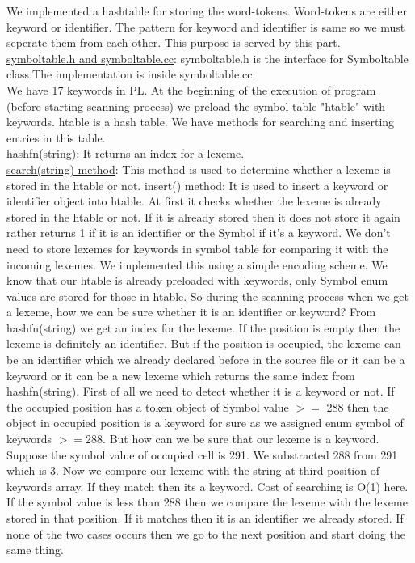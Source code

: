 \documentclass[paper=letter, fontsize=12pt]{scrartcl} %
\begin{document}
We implemented a hashtable for storing the word-tokens. Word-tokens are either keyword or identifier. The pattern for keyword and identifier is same so we must seperate them from each other. This purpose is served by this part.\\
\underline {symboltable.h and symboltable.cc}: symboltable.h  is the interface for Symboltable class.The implementation is inside symboltable.cc.\\
We have 17 keywords in PL. At the beginning of the execution of program (before starting scanning process) we preload the symbol table "htable" with keywords. htable is a hash table.
We have methods for searching and inserting entries in this table.\\
\underline {hashfn(string)}: It returns an index for a lexeme.\\
\underline {search(string) method}: This method is used to  determine whether a lexeme is stored in the htable or not. 
insert() method: It is used to insert a keyword or identifier object into htable. At first it checks whether the lexeme is already stored in the htable or not. If it is already stored then it does not store it again rather returns 1 if it is an identifier or the Symbol if it's a keyword. We don't need to store lexemes for keywords in symbol table for comparing it with the incoming lexemes. We implemented this using a simple encoding scheme. We know that our htable is already preloaded with keywords, only Symbol enum values are stored for those in htable. So during the scanning process when we get a lexeme, how we can be sure whether it is an identifier or keyword? From hashfn(string) we get an index for the lexeme. If the position is empty then the lexeme is definitely an identifier. But if the position is occupied, the lexeme can be an identifier which we already declared before in the source file or it can be a keyword or it can be a new lexeme which returns the same index from hashfn(string).
First of all we need to detect whether it is a keyword or not. If the occupied position has a token object of Symbol value $>=$ 288 then the object in occupied position is a keyword for sure as we assigned enum symbol of keywords $>=$288. But how can we be sure that our lexeme is a keyword. Suppose the symbol value of occupied cell is 291. We substracted 288 from 291 which is 3. Now we compare our lexeme with the string at third position of keywords array. If they match then its a keyword. Cost of searching is O(1) here. If the symbol value is less than 288 then we compare the lexeme with the lexeme stored in that position. If it matches then it is an identifier we already stored. If none of the two cases occurs then we go to the next position and start doing the same thing.\\
\end{document}
